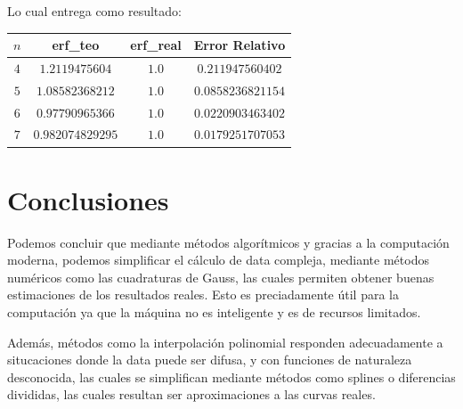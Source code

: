 \documentclass[12pt,letterpaper]{article}
\begin{document}
Lo cual entrega como resultado:
\begin{table}[!h]
\begin{center}
\begin{tabular}{|c|c|c|c|}
\hline
\textbf{$n$} & \textbf{erf\_teo} & \textbf{erf\_real} & \textbf{Error Relativo} \\ 
\hline \hline
$4$ & $1.2119475604$ & $1.0$ & $0.211947560402$ \\ \hline

$5$ & $1.08582368212$ & $1.0$ & $0.0858236821154$ \\ \hline

$6$ & $0.97790965366$ & $1.0$ & $0.0220903463402$ \\ \hline

$7$ & $0.982074829295$ & $1.0$ & $0.0179251707053$ \\ \hline
	\end{tabular}
\end{center}
\end{table}

\section{Conclusiones}
Podemos concluir que mediante métodos algorítmicos y gracias a la computación moderna, podemos simplificar el cálculo de data compleja, mediante métodos numéricos como las cuadraturas de Gauss, las cuales permiten obtener buenas estimaciones de los resultados reales. Esto es preciadamente útil para la computación ya que la máquina no es inteligente y es de recursos limitados.

Además, métodos como la interpolación polinomial responden adecuadamente a situcaciones donde la data puede ser difusa, y con funciones de naturaleza desconocida, las cuales se simplifican mediante métodos como splines o diferencias divididas, las cuales resultan ser aproximaciones a las curvas reales.
\end{document}
